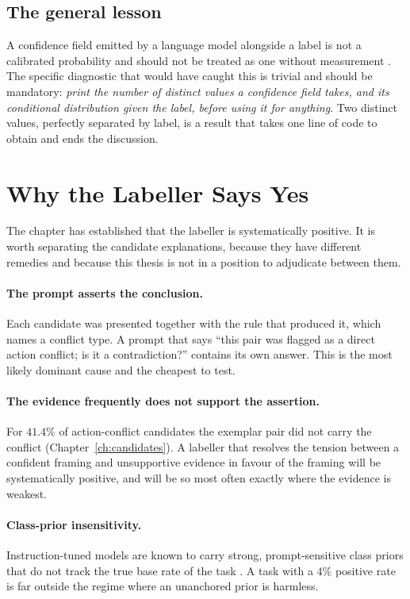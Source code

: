 \subsection{The general lesson}

A confidence field emitted by a language model alongside a label is not a
calibrated probability and should not be treated as one without measurement
\citep{guo2017calibration,zhao2021calibrate}. The specific diagnostic that
would have caught this is trivial and should be mandatory: \emph{print the
number of distinct values a confidence field takes, and its conditional
distribution given the label, before using it for anything}. Two distinct
values, perfectly separated by label, is a result that takes one line of code to
obtain and ends the discussion.

\section{Why the Labeller Says Yes}
\label{sec:weak-acquiescence}

The chapter has established that the labeller is systematically positive. It is
worth separating the candidate explanations, because they have different
remedies and because this thesis is not in a position to adjudicate between
them.

\paragraph{The prompt asserts the conclusion.} Each candidate was presented
together with the rule that produced it, which names a conflict type. A prompt
that says ``this pair was flagged as a direct action conflict; is it a
contradiction?'' contains its own answer. This is the most likely dominant
cause and the cheapest to test.

\paragraph{The evidence frequently does not support the assertion.} For $41.4\%$
of action-conflict candidates the exemplar pair did not carry the conflict
(Chapter~\ref{ch:candidates}). A labeller that resolves the tension between a
confident framing and unsupportive evidence in favour of the framing will be
systematically positive, and will be so most often exactly where the evidence is
weakest.

\paragraph{Class-prior insensitivity.} Instruction-tuned models are known to
carry strong, prompt-sensitive class priors that do not track the true base rate
of the task \citep{zhao2021calibrate}. A task with a $4\%$ positive rate is far
outside the regime where an unanchored prior is harmless.

